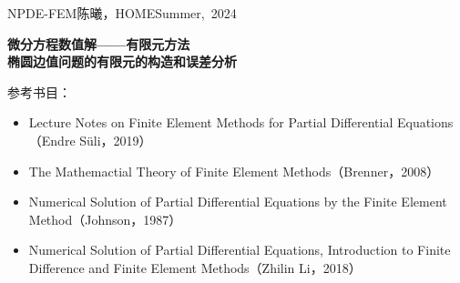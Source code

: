 \documentclass[a4paper,10pt]{ctexart}
\begin{document}
\hfill\vbox{\hbox{NPDE-FEM}\hbox{陈曦，HOME}\hbox{Summer, 2024}}

\begin{center}\Large
    \textbf{微分方程数值解——有限元方法}\\{\normalsize\bf {椭圆边值问题的有限元的构造和误差分析}}
\end{center}
\vskip 30pt
\small {参考书目：
\begin{itemize}
    \item Lecture Notes on Finite Element Methods for Partial Differential Equations（Endre Süli，2019）
    \item The Mathemactial Theory of Finite Element Methods（Brenner，2008）
    \item Numerical Solution of Partial Differential Equations by the Finite Element Method（Johnson，1987）
    \item Numerical Solution of Partial Differential Equations, Introduction to Finite Difference and Finite Element Methods（Zhilin Li，2018）
\end{itemize}}
\end{document}
